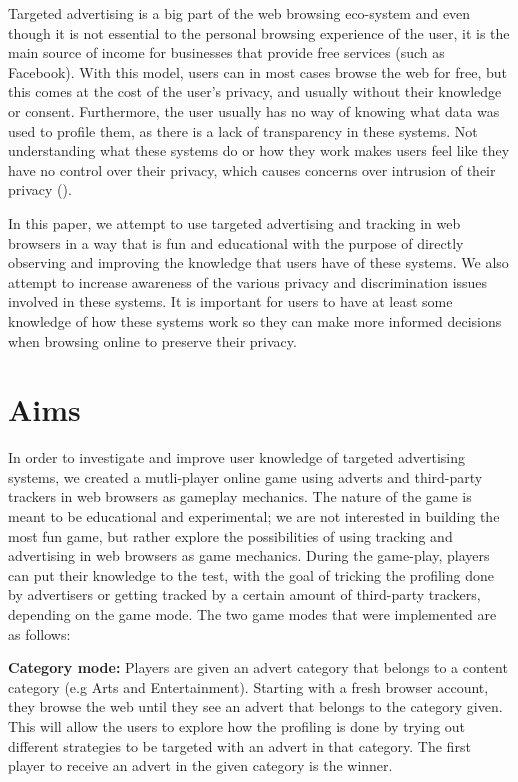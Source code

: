 \documentclass{l4proj}
\begin{document}
Targeted advertising is a big part of the web browsing eco-system and even though it is not essential to the personal browsing experience of the user, it is the main source of income for businesses that provide free services (such as Facebook). With this model, users can in most cases browse the web for free, but this comes at the cost of the user's privacy, and usually without their knowledge or consent. Furthermore, the user usually has no way of knowing what data was used to profile them, as there is a lack of transparency in these systems. Not understanding what these systems do or how they work makes users feel like they have no control over their privacy, which causes concerns over intrusion of their privacy (\cite{intro}). 

In this paper, we attempt to use targeted advertising and tracking in web browsers in a way that is fun and educational with the purpose of directly observing and improving the knowledge that users have of these systems. We also attempt to increase awareness of the various privacy and discrimination issues involved in these systems. It is important for users to have at least some knowledge of how these systems work so they can make more informed decisions when browsing online to preserve their privacy.

\section{Aims}
In order to investigate and improve user knowledge of targeted advertising systems, we created a mutli-player online game using adverts and third-party trackers in web browsers as gameplay mechanics. The nature of the game is meant to be educational and experimental; we are not interested in building the most fun game, but rather explore the possibilities of using tracking and advertising in web browsers as game mechanics. During the game-play, players can put their knowledge to the test, with the goal of tricking the profiling done by advertisers or getting tracked by a certain amount of third-party trackers, depending on the game mode. The two game modes that were implemented are as follows:

\textbf{Category mode:} Players are given an advert category that belongs to a content category (e.g Arts and Entertainment). Starting with a fresh browser account, they browse the web until they see an advert that belongs to the category given. This will allow the users to explore how the profiling is done by trying out different strategies to be targeted with an advert in that category. The first player to receive an advert in the given category is the winner. 
\end{document}
